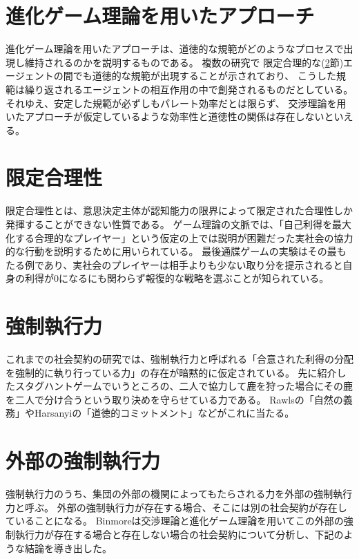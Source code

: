 \section{進化ゲーム理論を用いたアプローチ}
\label{evolutionary-game-theory}
進化ゲーム理論を用いたアプローチは、道徳的な規範がどのようなプロセスで出現し維持されるのかを説明するものである。
複数の研究で\cite{sugden1986}\cite{binmore1994}\cite{binmore1998}\cite{skyrms1996}
限定合理的な(\ref{bounded-rationalty}節)エージェントの間でも道徳的な規範が出現することが示されており、
こうした規範は繰り返されるエージェントの相互作用の中で創発されるものだとしている。
それゆえ、安定した規範が必ずしもパレート効率だとは限らず、
交渉理論を用いたアプローチが仮定しているような効率性と道徳性の関係は存在しないといえる。\cite{sep-game-ethics}

\section{限定合理性}
\label{bounded-rationalty}
限定合理性とは、意思決定主体が認知能力の限界によって限定された合理性しか発揮することができない性質である。\cite{simon1947}
ゲーム理論の文脈では、「自己利得を最大化する合理的なプレイヤー」という仮定の上では説明が困難だった実社会の協力的な行動を説明するために用いられている。\cite{sep-bounded-rationality}
最後通牒ゲームの実験はその最もたる例であり、実社会のプレイヤーは相手よりも少ない取り分を提示されると自身の利得が0になるにも関わらず報復的な戦略を選ぶことが知られている。\cite{GUTH1982367}

\section{強制執行力}
これまでの社会契約の研究では、強制執行力と呼ばれる「合意された利得の分配を強制的に執り行っている力」の存在が暗黙的に仮定されている。
先に紹介したスタグハントゲームでいうところの、二人で協力して鹿を狩った場合にその鹿を二人で分け合うという取り決めを守らせている力である。
Rawlsの「自然の義務」\cite{rawls1971}やHarsanyiの「道徳的コミットメント」\cite{harsanyi1955}などがこれに当たる。\cite{binmore2005}

\section{外部の強制執行力}
強制執行力のうち、集団の外部の機関によってもたらされる力を外部の強制執行力と呼ぶ。
外部の強制執行力が存在する場合、そこには別の社会契約が存在していることになる。
Binmoreは交渉理論と進化ゲーム理論を用いてこの外部の強制執行力が存在する場合と存在しない場合の社会契約について分析し、下記のような結論を導き出した。\cite{binmore2005}

